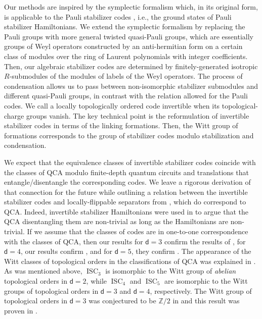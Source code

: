 \documentclass[sn-mathphys-num]{sn-jnl}
\theoremstyle{definition}
\numberwithin{equation}{section}
\theoremstyle{definition}
\def\IZ{{\mathbb{Z}}}
\newcommand{\dd}{{\mathsf{d}}} %
\begin{document}
Our methods are inspired by the symplectic formalism which, in its original form, is applicable to the Pauli stabilizer codes \cite{haah2013,haah2016,haah2021classification,haah2022topological,haah2021clifford,ruba2024homological,Geiko_2024}, i.e., the ground states of Pauli stabilizer Hamiltonians. We extend the symplectic formalism by replacing the Pauli groups with more general twisted quasi-Pauli groups, which are essentially groups of Weyl operators constructed by an anti-hermitian form on a certain class of modules over the ring  of Laurent polynomials with integer coefficients. Then, our algebraic stabilizer codes are determined by finitely-generated isotropic $R$-submodules of the modules of labels of the Weyl operators. The process of condensation allows us to pass between non-isomorphic stabilizer submodules and different quasi-Pauli groups, in contrast with the relation allowed for the Pauli codes. We call a locally topologically ordered code invertible when its topological-charge groups vanish. The key technical point is the reformulation of invertible stabilizer codes in terms of the linking formations. Then, the Witt group of formations corresponds to the group of stabilizer codes modulo stabilization and condensation. 

We expect that the equivalence classes of invertible stabilizer codes coincide with the classes of QCA modulo finite-depth quantum circuits and translations that entangle/disentangle the corresponding codes. We leave a rigorous derivation of that connection for the future while outlining a relation between the invertible stabilizer codes and locally-flippable separators from \cite{haah2023nontrivial}, which do correspond to QCA. Indeed, invertible stabilizer Hamiltonians were used in \cite{haah2023nontrivial, haah2021clifford, fidkowski2022gravitational,Chen_2023} to argue that the QCA disentangling them are non-trivial as long as the Hamiltonians are non-trivial. If we assume that the classes of codes are in one-to-one correspondence with the classes of QCA, then our results for $\dd=3$ confirm the results of \cite{shirley2022three}, for $\dd=4$, our results confirm \cite{fidkowski2022gravitational,Chen_2023}, and for $\dd=5$, they confirm \cite{Fidkowski_2025}. The appearance of the Witt classes of topological orders \cite{Johnson_Freyd_2022} in the classifications of QCA was explained in \cite{haah2021clifford}. As was mentioned above, $\operatorname{ISC}_3$ is isomorphic to the Witt group of \textit{abelian} topological orders in $\dd=2$, while $\operatorname{ISC}_4$ and $\operatorname{ISC}_5$ are isomorphic to the Witt groups of topological orders in $\dd=3$ and $\dd=4$, respectively. The Witt group of topological orders in $\dd=3$ was conjectured to be $\IZ/2$ in \cite{johnsonfreyd2020Z2} and this result was proven in \cite{Johnson_Freyd_2023}. 
\end{document}
